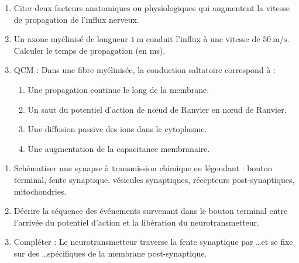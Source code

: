 \documentclass[11pt]{article}
\begin{document}
\begin{exercice}
\begin{enumerate}
    \item Citer deux facteurs anatomiques ou physiologiques qui augmentent la vitesse de propagation de l'influx nerveux.
    \item Un axone myélinisé de longueur $\SI{1}{\meter}$ conduit l'influx à une vitesse de $\SI{50}{\meter\per\second}$. Calculer le temps de propagation (en ms).
    \item QCM : Dans une fibre myélinisée, la conduction saltatoire correspond à :
    \begin{enumerate}
        \item Une propagation continue le long de la membrane.
        \item Un saut du potentiel d'action de nœud de Ranvier en nœud de Ranvier.
        \item Une diffusion passive des ions dans le cytoplasme.
        \item Une augmentation de la capacitance membranaire.
    \end{enumerate}
\end{enumerate}
\end{exercice}

\begin{exercice}
\begin{enumerate}
    \item Schématiser une synapse à transmission chimique en légendant : bouton terminal, fente synaptique, vésicules synaptiques, récepteurs post-synaptiques, mitochondries.
    \item Décrire la séquence des événements survenant dans le bouton terminal entre l'arrivée du potentiel d'action et la libération du neurotransmetteur.
    \item Compléter : Le neurotransmetteur traverse la fente synaptique par \ldots et se fixe sur des \ldots spécifiques de la membrane post-synaptique.
\end{enumerate}
\end{exercice}
\end{document}
